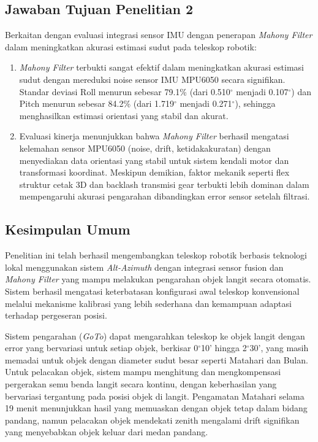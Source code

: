 \subsection{Jawaban Tujuan Penelitian 2}
Berkaitan dengan evaluasi integrasi sensor IMU dengan penerapan \textit{Mahony Filter} dalam meningkatkan akurasi estimasi sudut pada teleskop robotik: \par

\begin{enumerate}
    \item \textit{Mahony Filter} terbukti sangat efektif dalam meningkatkan akurasi estimasi sudut dengan mereduksi noise sensor IMU MPU6050 secara signifikan. Standar deviasi Roll menurun sebesar 79.1\% (dari 0.510$^{\circ}$ menjadi 0.107$^{\circ}$) dan Pitch menurun sebesar 84.2\% (dari 1.719$^{\circ}$ menjadi 0.271$^{\circ}$), sehingga menghasilkan estimasi orientasi yang stabil dan akurat.
    
    
    \item Evaluasi kinerja menunjukkan bahwa \textit{Mahony Filter} berhasil mengatasi kelemahan sensor MPU6050 (noise, drift, ketidakakuratan) dengan menyediakan data orientasi yang stabil untuk sistem kendali motor dan transformasi koordinat. Meskipun demikian, faktor mekanik seperti flex struktur cetak 3D dan backlash transmisi gear terbukti lebih dominan dalam mempengaruhi akurasi pengarahan dibandingkan error sensor setelah filtrasi.
\end{enumerate}

\subsection{Kesimpulan Umum}
Penelitian ini telah berhasil mengembangkan teleskop robotik berbasis teknologi lokal menggunakan sistem \textit{Alt-Azimuth} dengan integrasi sensor fusion dan \textit{Mahony Filter} yang mampu melakukan pengarahan objek langit secara otomatis. Sistem berhasil mengatasi keterbatasan konfigurasi awal teleskop konvensional melalui mekanisme kalibrasi yang lebih sederhana dan kemampuan adaptasi terhadap pergeseran posisi. \par

Sistem pengarahan (\textit{GoTo}) dapat mengarahkan teleskop ke objek langit dengan error yang bervariasi untuk setiap objek, berkisar 0$^\circ$10' hingga 2$^\circ$30', yang masih memadai untuk objek dengan diameter sudut besar seperti Matahari dan Bulan. Untuk pelacakan objek, sistem mampu menghitung dan mengkompensasi pergerakan semu benda langit secara kontinu, dengan keberhasilan yang bervariasi tergantung pada posisi objek di langit. Pengamatan Matahari selama 19 menit menunjukkan hasil yang memuaskan dengan objek tetap dalam bidang pandang, namun pelacakan objek mendekati zenith mengalami drift signifikan yang menyebabkan objek keluar dari medan pandang. \par

